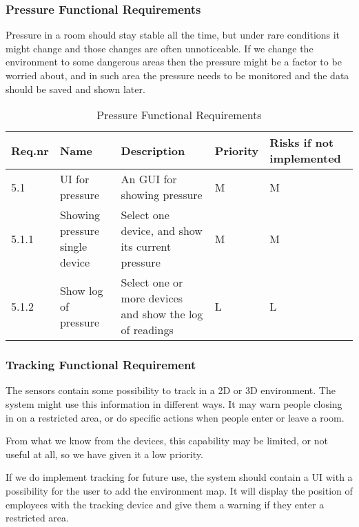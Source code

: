 \documentclass[../document]{subfiles}
\begin{document}
\subsubsection{Pressure Functional Requirements}
Pressure in a room should stay stable all the time, but under rare conditions it might change and those changes are often unnoticeable. If we change the environment to some dangerous areas then the pressure might be a factor to be worried about, and in such area the pressure needs to be monitored and the data should be saved and shown later.

\begin{table}[H]
\caption{Pressure Functional Requirements}
\centering
\begin{tabularx}{\textwidth}{|l|X|X|l|X|}
	\hline
	Req.nr
	&Name
	&Description
	&Priority
	&Risks if not implemented
	\\ \hline 5.1
	&UI for pressure
	&An GUI for showing pressure
	&M
	&M
	\\ \hline 5.1.1
	&Showing pressure single device
	&Select one device, and show its current pressure
	&M
	&M
	\\ \hline 5.1.2
	&Show log of pressure
	&Select one or more devices and show the log of readings
	&L
	&L
	\\ \hline 
\end{tabularx}
\end{table}

\subsubsection{Tracking Functional Requirement}
The sensors contain some possibility to track in a 2D or 3D environment. The system might use this information in different ways. It may warn people closing in on a restricted area, or do specific actions when people enter or leave a room.

From what we know from the devices, this capability may be limited, or not useful at all, so we have given it a low priority.

If we do implement tracking for future use, the system should contain a UI with a possibility for the user to add the environment map. It will display the position of employees with the tracking device and give them a warning if they enter a restricted area.
\end{document}
